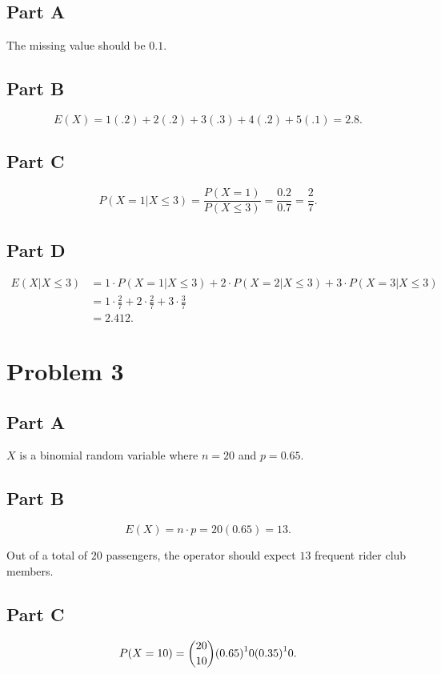 \documentclass[12pt]{extarticle}
\begin{document}
\subsection*{Part A}
The missing value should be $0.1$.

\subsection*{Part B}
\[
	E(X) = 1(.2) + 2(.2) + 3(.3) + 4(.2) + 5(.1) = 2.8
.\]

\subsection*{Part C}
\[
	P(X = 1 | X \leq 3) = \frac{P(X = 1)}{P(X \leq 3)} = \frac{0.2}{0.7} = \frac{2}{7}
.\]

\subsection*{Part D}
\begin{align*}
	E(X | X \leq 3) &= 1\cdot P (X = 1|X \leq 3) + 2\cdot P (X = 2|X \leq 3) + 3\cdot P (X = 3|X \leq 3) \\
									&= 1 \cdot\frac{2}{7} + 2\cdot\frac{2}{7} + 3\cdot\frac{3}{7} \\
									&= 2.412
.\end{align*}

\section*{Problem 3}
\subsection*{Part A}
$X$ is a binomial random variable where $n=20$ and $p=0.65$.

\subsection*{Part B}
\[
	E(X) = n\cdot p = 20 (0.65) = 13
.\]

Out of a total of $20$ passengers, the operator should expect $13$ frequent rider club members.

\subsection*{Part C}
\[
	P(X = 10) = \binom{20}{10} \qty(0.65)^10 \qty(0.35)^10
.\]
\end{document}
